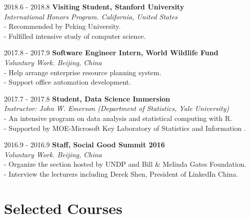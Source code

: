 \documentclass{academiccv}
\begin{document}
\begin{tablist}

\item[2018.6 - 2018.8] 	\tab \textbf {Visiting Student, Stanford University} \textbf
					\\ \tab \emph{ International Honors Program. California, United States}\emph
				      \\ \tab - Recommended by Peking University.
				     \\ \tab - Fulfilled intensive study of computer science.


\item[2017.8 - 2017.9] 	\tab \textbf {Software Engineer Intern, World Wildlife Fund} \textbf
					\\ \tab \emph{Voluntary Work. Beijing, China}\emph
				      \\ \tab - Help arrange enterprise resource planning system.
				     \\ \tab - Support office automation development.
				   
				     				     
\item[2017.7 - 2017.8] 	\tab \textbf {Student, Data Science Immersion} \textbf
				     \\ \tab \emph{Instructor: John W. Emerson (Department of Statistics, Yale University)}\emph
				     \\ \tab - An intensive program on data analysis and statistical computing with R.
				     \\ \tab - Supported by MOE-Microsoft Key Laboratory of Statistics and Information	.		  

\item[2016.9 - 2016.9] 	\tab \textbf {Staff, Social Good Summit 2016} \textbf
				     \\ \tab \emph{Voluntary Work. Beijing, China}\emph
				     \\ \tab - Organize the section hosted by UNDP and Bill \& Melinda Gates Foundation.
				     \\ \tab - Interview the lecturers including Derek Shen, President of LinkedIn China.	  
\end{tablist}

\section*{Selected Courses}
\end{document}
